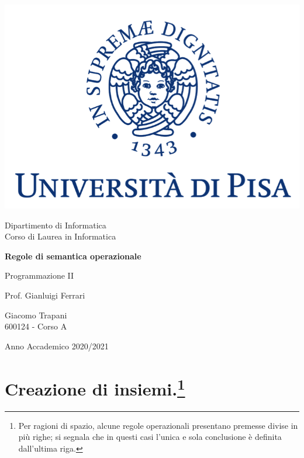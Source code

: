 \documentclass[10pt, italian, openany]{book}
\begin{document}
\begin{titlepage}
	\clearpage\thispagestyle{empty}
	\centering
	\vspace{1cm}

    \includegraphics[scale=0.60]{unipi-logo.png}
    
	{\normalsize \noindent Dipartimento di Informatica \\
	             Corso di Laurea in Informatica \par}
	
	\vspace{2cm}
	{\Huge \textbf{Regole di semantica operazionale} \par}
	\vspace{1cm}
	{\large Programmazione II}
	\vspace{5cm}

    \begin{minipage}[t]{0.47\textwidth}
    	{\large{ Prof. Gianluigi Ferrari}}
    \end{minipage}\hfill\begin{minipage}[t]{0.47\textwidth}\raggedleft
    	{\large {Giacomo Trapani \\ 600124 - Corso A\\ }}
    \end{minipage}

    \vspace{4cm}

	{\normalsize Anno Accademico 2020/2021 \par}

	\pagebreak

\end{titlepage}

\chapter*{Creazione di insiemi.\footnote{Per ragioni di spazio, alcune regole operazionali presentano premesse divise in pi\`u righe; si segnala che in questi casi l'unica e sola conclusione \`e definita dall'ultima riga.}}
\end{document}
